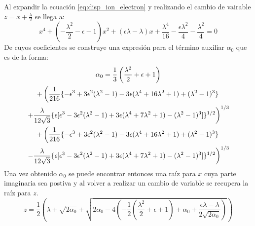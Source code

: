\documentclass[../tesis_main_file.tex]{subfiles}
\begin{document}
Al expandir la ecuación \ref{eq:disp_ion_electron} y realizando el cambio de vairable $z=x+\frac{\lambda}{2}$ se llega a:
\begin{equation}
x^4 + (-\frac{\lambda^2}{2} -\epsilon -1)x^2 + (\epsilon \lambda - \lambda)x + \frac{\lambda^4}{16}-\frac{\epsilon \lambda^2}{4}-\frac{\lambda^2}{4}=0
\end{equation}
De cuyos coeficientes se construye una expresión para el término auxiliar $\alpha_0$ que es de la forma:
\begin{multline}
\alpha_0 = \frac{1}{3}\left(\frac{\lambda^2}{2} + \epsilon + 1 \right)\\
+ \left(\frac{1}{216}\lbrace-\epsilon^3+3\epsilon^2(\lambda^2-1)-
3\epsilon(\lambda^4 +16\lambda^2 +1)+ (\lambda^2 -1)^3\rbrace \right. \\
\left. +\frac{\lambda}{12\sqrt{3}}\lbrace\epsilon [\epsilon^3-3\epsilon^2(\lambda^2 -1)+3\epsilon(\lambda^4 + 7\lambda^2 +1)- (\lambda^2-1)^3]\rbrace^{1/2} \vphantom{\frac{1}{216}}\right)^{1/3}\\
+ \left(\frac{1}{216}\lbrace-\epsilon^3+3\epsilon^2(\lambda^2-1)-
3\epsilon(\lambda^4 +16\lambda^2 +1)+ (\lambda^2 -1)^3\rbrace \right. \\
\left. -\frac{\lambda}{12\sqrt{3}}\lbrace\epsilon [\epsilon^3-3\epsilon^2(\lambda^2 -1)+3\epsilon(\lambda^4 + 7\lambda^2 +1)- (\lambda^2-1)^3]\rbrace^{1/2} \vphantom{\frac{1}{216}}\right)^{1/3}
\end{multline}
Una vez obtenido $\alpha_0$ se puede encontrar entonces una raíz para $x$ cuya parte imaginaria sea postiva y al volver a realizar un cambio de variable se recupera la raíz para $z$.
\begin{equation}
z= \frac{1}{2} \left( \lambda + \sqrt{2\alpha_0} + \sqrt{2\alpha_0 -4 \left(-\frac{1}{2}(\frac{\lambda^2}{2}+\epsilon+1)+\alpha_0 +\frac{\epsilon \lambda - \lambda}{2\sqrt{2\alpha_0}}\right)}\right)
\end{equation}
\end{document}
